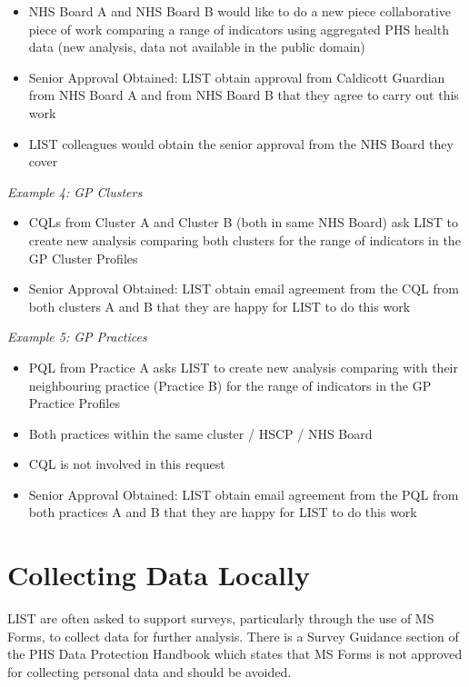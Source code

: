 \documentclass[
]{book}
\begin{document}
\begin{itemize}
\item
  NHS Board A and NHS Board B would like to do a new piece collaborative piece of work comparing a range of indicators using aggregated PHS health data (new analysis, data not available in the public domain)
\item
  Senior Approval Obtained: LIST obtain approval from Caldicott Guardian from NHS Board A and from NHS Board B that they agree to carry out this work
\item
  LIST colleagues would obtain the senior approval from the NHS Board they cover
\end{itemize}

\emph{Example 4: GP Clusters}

\begin{itemize}
\item
  CQLs from Cluster A and Cluster B (both in same NHS Board) ask LIST to create new analysis comparing both clusters for the range of indicators in the GP Cluster Profiles
\item
  Senior Approval Obtained: LIST obtain email agreement from the CQL from both clusters A and B that they are happy for LIST to do this work
\end{itemize}

\emph{Example 5: GP Practices}

\begin{itemize}
\item
  PQL from Practice A asks LIST to create new analysis comparing with their neighbouring practice (Practice B) for the range of indicators in the GP Practice Profiles
\item
  Both practices within the same cluster / HSCP / NHS Board
\item
  CQL is not involved in this request
\item
  Senior Approval Obtained: LIST obtain email agreement from the PQL from both practices A and B that they are happy for LIST to do this work
\end{itemize}

\hypertarget{collecting-data-locally}{%
\section{Collecting Data Locally}\label{collecting-data-locally}}

LIST are often asked to support surveys, particularly through the use of MS Forms, to collect data for further analysis. There is a Survey Guidance section of the PHS Data Protection Handbook which states that MS Forms is not approved for collecting personal data and should be avoided.
\end{document}
